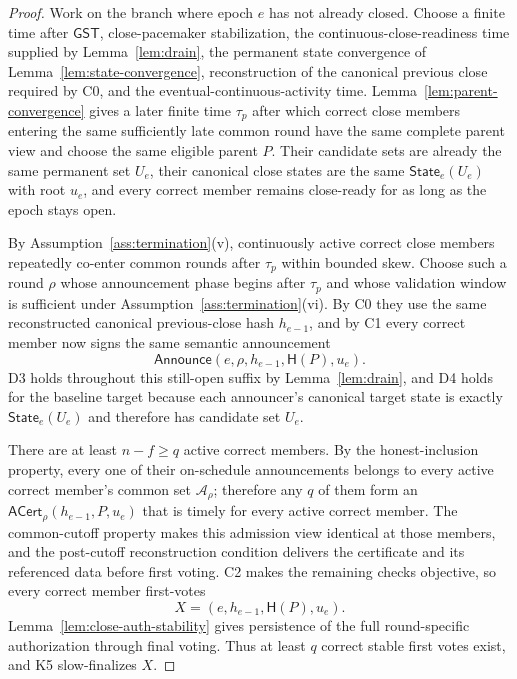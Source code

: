 \documentclass[11pt]{article}
\theoremstyle{definition}
\theoremstyle{remark}
\newcommand{\GST}{\mathsf{GST}}
\newcommand{\State}{\mathsf{State}}
\newcommand{\hash}{\mathsf{H}}
\newcommand{\Announce}{\mathsf{Announce}}
\newcommand{\ACert}{\mathsf{ACert}}
\begin{document}
\begin{proof}
Work on the branch where epoch $e$ has not already closed. Choose a finite time after $\GST$, close-pacemaker stabilization, the continuous-close-readiness time supplied by Lemma~\ref{lem:drain}, the permanent state convergence of Lemma~\ref{lem:state-convergence}, reconstruction of the canonical previous close required by C0, and the eventual-continuous-activity time. Lemma~\ref{lem:parent-convergence} gives a later finite time $\tau_p$ after which correct close members entering the same sufficiently late common round have the same complete parent view and choose the same eligible parent $P$. Their candidate sets are already the same permanent set $U_e$, their canonical close states are the same $\State_e(U_e)$ with root $u_e$, and every correct member remains close-ready for as long as the epoch stays open.

By Assumption~\ref{ass:termination}(v), continuously active correct close members repeatedly co-enter common rounds after $\tau_p$ within bounded skew. Choose such a round $\rho$ whose announcement phase begins after $\tau_p$ and whose validation window is sufficient under Assumption~\ref{ass:termination}(vi). By C0 they use the same reconstructed canonical previous-close hash $h_{e-1}$, and by C1 every correct member now signs the same semantic announcement
\[
  \Announce(e,\rho,h_{e-1},\hash(P),u_e).
\]
D3 holds throughout this still-open suffix by Lemma~\ref{lem:drain}, and D4 holds for the baseline target because each announcer's canonical target state is exactly $\State_e(U_e)$ and therefore has candidate set $U_e$.

There are at least $n-f\ge q$ active correct members. By the honest-inclusion property, every one of their on-schedule announcements belongs to every active correct member's common set $\mathcal A_\rho$; therefore any $q$ of them form an $\ACert_\rho(h_{e-1},P,u_e)$ that is timely for every active correct member. The common-cutoff property makes this admission view identical at those members, and the post-cutoff reconstruction condition delivers the certificate and its referenced data before first voting. C2 makes the remaining checks objective, so every correct member first-votes
\[
  X=(e,h_{e-1},\hash(P),u_e).
\]
Lemma~\ref{lem:close-auth-stability} gives persistence of the full round-specific authorization through final voting. Thus at least $q$ correct stable first votes exist, and K5 slow-finalizes $X$.
\end{proof}
\end{document}
